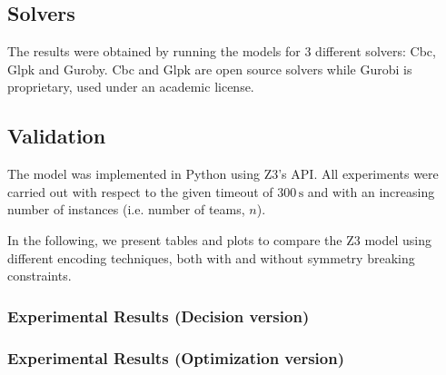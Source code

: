 \subsection{Solvers}
The results were obtained by running the models for 3 different solvers: Cbc, Glpk and Guroby. Cbc and Glpk are open source solvers while Gurobi is proprietary, used under an academic license.

\subsection{Validation}
The model was implemented in Python using Z3's API. All experiments were carried out with respect to the given timeout of $300\,\mathrm{s}$ and with an increasing number of instances (i.e. number of teams, $n$).

In the following, we present tables and plots to compare the Z3 model using different encoding techniques, both with and without symmetry breaking constraints.

\subsubsection{Experimental Results (Decision version)}

\subsubsection{Experimental Results (Optimization version)}